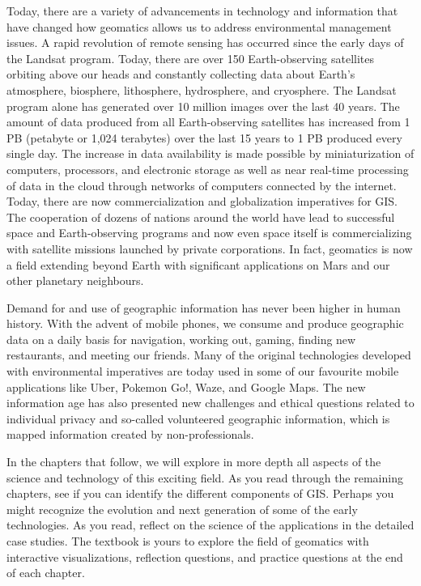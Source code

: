\documentclass[
]{book}
\begin{document}
Today, there are a variety of advancements in technology and information that have changed how geomatics allows us to address environmental management issues. A rapid revolution of remote sensing has occurred since the early days of the Landsat program. Today, there are over 150 Earth-observing satellites orbiting above our heads and constantly collecting data about Earth's atmosphere, biosphere, lithosphere, hydrosphere, and cryosphere. The Landsat program alone has generated over 10 million images over the last 40 years. The amount of data produced from all Earth-observing satellites has increased from 1 PB (petabyte or 1,024 terabytes) over the last 15 years to 1 PB produced every single day. The increase in data availability is made possible by miniaturization of computers, processors, and electronic storage as well as near real-time processing of data in the cloud through networks of computers connected by the internet. Today, there are now commercialization and globalization imperatives for GIS. The cooperation of dozens of nations around the world have lead to successful space and Earth-observing programs and now even space itself is commercializing with satellite missions launched by private corporations. In fact, geomatics is now a field extending beyond Earth with significant applications on Mars and our other planetary neighbours.

Demand for and use of geographic information has never been higher in human history. With the advent of mobile phones, we consume and produce geographic data on a daily basis for navigation, working out, gaming, finding new restaurants, and meeting our friends. Many of the original technologies developed with environmental imperatives are today used in some of our favourite mobile applications like Uber, Pokemon Go!, Waze, and Google Maps. The new information age has also presented new challenges and ethical questions related to individual privacy and so-called volunteered geographic information, which is mapped information created by non-professionals.

In the chapters that follow, we will explore in more depth all aspects of the science and technology of this exciting field. As you read through the remaining chapters, see if you can identify the different components of GIS. Perhaps you might recognize the evolution and next generation of some of the early technologies. As you read, reflect on the science of the applications in the detailed case studies. The textbook is yours to explore the field of geomatics with interactive visualizations, reflection questions, and practice questions at the end of each chapter.
\end{document}
